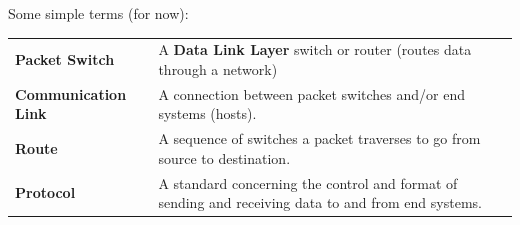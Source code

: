 Some simple terms (for now):
\begin{center}
    \begin{tabular}{l p{}}
        \textbf{Packet Switch}      & A \textbf{Data Link Layer} switch or router (routes data through a network)                         \\
        \textbf{Communication Link} & A connection between packet switches and/or end systems (hosts).                                    \\
        \textbf{Route}              & A sequence of switches a packet traverses to go from source to destination.                         \\
        \textbf{Protocol}           & A standard concerning the control and format of sending and receiving data to and from end systems. \\
    \end{tabular}
\end{center}

